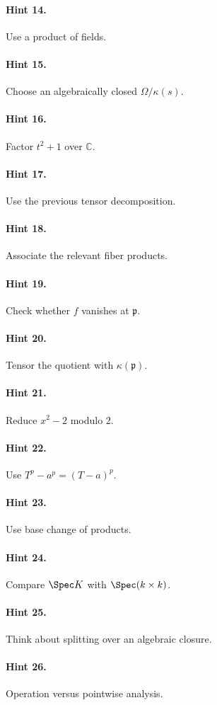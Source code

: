 \paragraph{Hint 14.} Use a product of fields.
\paragraph{Hint 15.} Choose an algebraically closed $\Omega/\kappa(s)$.
\paragraph{Hint 16.} Factor $t^2+1$ over $\mathbb C$.
\paragraph{Hint 17.} Use the previous tensor decomposition.
\paragraph{Hint 18.} Associate the relevant fiber products.
\paragraph{Hint 19.} Check whether $f$ vanishes at $\mathfrak p$.
\paragraph{Hint 20.} Tensor the quotient with $\kappa(\mathfrak p)$.
\paragraph{Hint 21.} Reduce $x^2-2$ modulo $2$.
\paragraph{Hint 22.} Use $T^p-a^p=(T-a)^p$.
\paragraph{Hint 23.} Use base change of products.
\paragraph{Hint 24.} Compare $\Spec K$ with $\Spec(k\times k)$.
\paragraph{Hint 25.} Think about splitting over an algebraic closure.
\paragraph{Hint 26.} Operation versus pointwise analysis.
